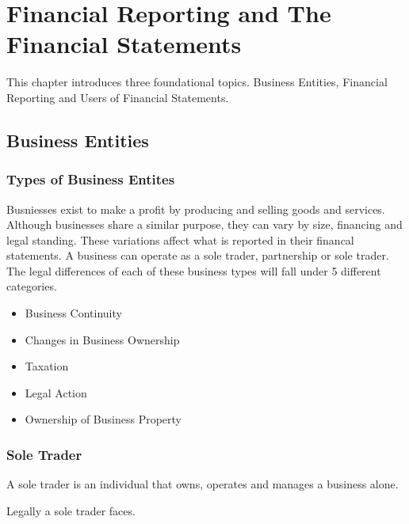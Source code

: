 \section{Financial Reporting and The Financial Statements}

This chapter introduces three foundational topics. Business Entities, Financial Reporting and Users of Financial Statements.

\subsection{Business Entities} 

\subsubsection{Types of Business Entites}

Busniesses exist to make a profit by producing and selling goods and services. Although businesses 
share a similar purpose, they can vary by size, financing and legal standing. These variations affect what is reported in their financal statements. 
A business can operate as a sole trader, partnership or sole trader. The legal differences of each of these business types will fall under 5 different categories. 

\begin{itemize}
    \item Business Continuity 
    \item Changes in Business Ownership 
    \item Taxation 
    \item Legal Action 
    \item Ownership of Business Property
\end{itemize}

\subsubsection{Sole Trader}

A sole trader is an individual that owns, operates and manages a business alone. 

Legally a sole trader faces. 

